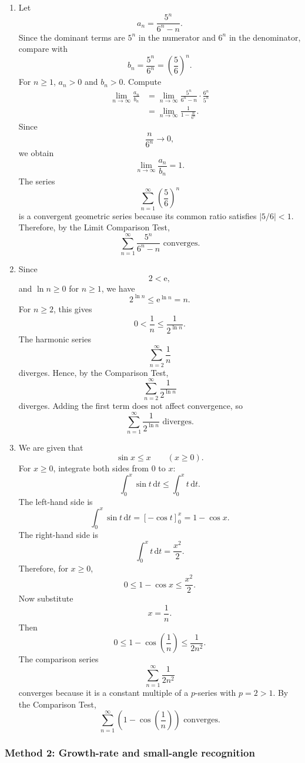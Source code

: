 \documentclass[12pt]{article}
\newcommand{\dd}{\,\mathrm{d}}
\newcommand{\ee}{\mathrm{e}}
\begin{document}
\begin{enumerate}[label=(\alph*)]
\item Let
\[
a_n=\frac{5^n}{6^n-n}.
\]
Since the dominant terms are $5^n$ in the numerator and $6^n$ in the denominator, compare with
\[
b_n=\frac{5^n}{6^n}=\left(\frac56\right)^n.
\]
For $n\ge1$, $a_n>0$ and $b_n>0$. Compute
\begin{align*}
\lim_{n\to\infty}\frac{a_n}{b_n}
&=
\lim_{n\to\infty}
\frac{5^n}{6^n-n}
\cdot
\frac{6^n}{5^n}\\
&=
\lim_{n\to\infty}
\frac{1}{1-\frac{n}{6^n}}.
\end{align*}
Since
\[
\frac{n}{6^n}\to0,
\]
we obtain
\[
\lim_{n\to\infty}\frac{a_n}{b_n}=1.
\]
The series
\[
\sum_{n=1}^{\infty}\left(\frac56\right)^n
\]
is a convergent geometric series because its common ratio satisfies $|5/6|<1$. Therefore, by the Limit Comparison Test,
\[
\boxed{\displaystyle
\sum_{n=1}^{\infty}\frac{5^n}{6^n-n}
\text{ converges}.}
\]

\item Since
\[
2<\ee,
\]
and $\ln n\ge0$ for $n\ge1$, we have
\[
2^{\ln n}\le \ee^{\ln n}=n.
\]
For $n\ge2$, this gives
\[
0<\frac1n\le \frac1{2^{\ln n}}.
\]
The harmonic series
\[
\sum_{n=2}^{\infty}\frac1n
\]
diverges. Hence, by the Comparison Test,
\[
\sum_{n=2}^{\infty}\frac1{2^{\ln n}}
\]
diverges. Adding the first term does not affect convergence, so
\[
\boxed{\displaystyle
\sum_{n=1}^{\infty}\frac1{2^{\ln n}}
\text{ diverges}.}
\]

\item We are given that
\[
\sin x\le x
\qquad (x\ge0).
\]
For $x\ge0$, integrate both sides from $0$ to $x$:
\[
\int_0^x \sin t\dd t
\le
\int_0^x t\dd t.
\]
The left-hand side is
\[
\int_0^x \sin t\dd t
=
[-\cos t]_0^x
=
1-\cos x.
\]
The right-hand side is
\[
\int_0^x t\dd t=\frac{x^2}{2}.
\]
Therefore, for $x\ge0$,
\[
0\le 1-\cos x\le \frac{x^2}{2}.
\]
Now substitute
\[
x=\frac1n.
\]
Then
\[
0\le 1-\cos\left(\frac1n\right)\le \frac1{2n^2}.
\]
The comparison series
\[
\sum_{n=1}^{\infty}\frac1{2n^2}
\]
converges because it is a constant multiple of a $p$-series with $p=2>1$. By the Comparison Test,
\[
\boxed{\displaystyle
\sum_{n=1}^{\infty}\left(1-\cos\left(\frac1n\right)\right)
\text{ converges}.}
\]
\end{enumerate}

\newpage
\subsubsection{Method 2: Growth-rate and small-angle recognition}
\end{document}
